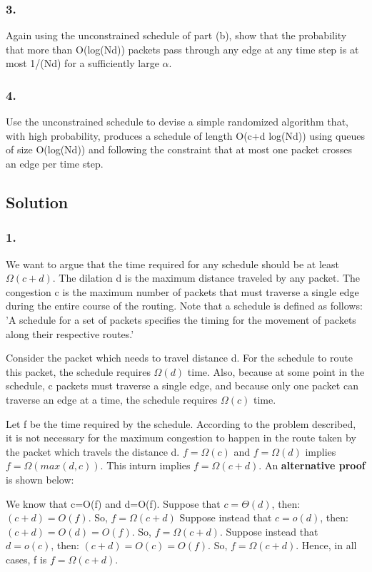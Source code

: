\documentclass[10pt]{article}
\begin{document}
\subsubsection{3.}
Again using the unconstrained schedule of part (b), show that the probability that more than O(log(Nd)) packets pass through any edge at any time step is at most 1/(Nd) for a sufficiently large $\alpha$.

\subsubsection{4.}
Use the unconstrained schedule to devise a simple randomized algorithm that, with high probability, produces a schedule of length O(c+d log(Nd)) using queues of size O(log(Nd)) and following the constraint that at most one packet crosses an edge per time step.


\subsection{Solution}

\subsubsection{1.}
We want to argue that the time required for any schedule should be at least $\Omega(c+d)$. The dilation d is the maximum distance traveled by any packet. The congestion c is the maximum number of packets that must traverse a single edge during the entire course of the routing. Note that a schedule is defined as follows: 'A schedule for a set of packets specifies the timing for the movement of packets along their respective routes.'

Consider the packet which needs to travel distance d. For the schedule to route this packet, the schedule requires $\Omega(d)$ time. Also, because at some point in the schedule, c packets must traverse a single edge, and because only one packet can traverse an edge at a time, the schedule requires $\Omega(c)$ time.

Let f be the time required by the schedule. According to the problem described, it is not necessary for the maximum congestion to happen in the route taken by the packet which travels the distance d. $f=\Omega(c)$ and $f=\Omega(d)$ implies $f=\Omega(max(d,c))$. This inturn implies $f = \Omega(c+d)$. An \textbf{alternative proof} is shown below:

We know that c=O(f) and d=O(f). Suppose that $c=\Theta(d)$, then: $(c+d)=O(f)$. So, $f = \Omega(c+d)$ Suppose instead that $c=o(d)$, then: $(c+d)= O(d) = O(f)$. So, $f = \Omega(c+d)$. Suppose instead that $d=o(c)$, then: $(c+d)= O(c) = O(f)$. So, $f = \Omega(c+d)$. Hence, in all cases, f is $f = \Omega(c+d)$.
\end{document}
